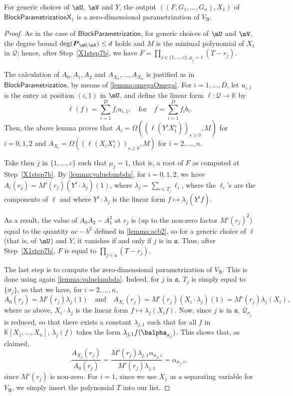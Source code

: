 \documentclass[12pt]{article}
\newcommand{\mat}[1]{\bm{\MakeUppercase{#1}}} %
\newcommand{\mainalgoname}{\mathsf{ BlockParametrization}}
\newcommand{\mf}{Y}
\newcommand{\residueI}{\mathscr{Q}}
\def\K{\mathbb{K}}
\def\K {\ensuremath{\mathbb{K}}}
\def\Kbar {{\ensuremath{\overline{\mathbb{K}}}}}
\begin{document}
\begin{lemma}
  For generic choices of $\mU$, $\mV$ and $\mf$, the output
  $((F,G_1,\dots,G_n),X_1)$ of $\mathsf{BlockParametrizationX}_1$ is a
  zero-dimensional parametrization of $V_{\mathfrak{A}}$.
\end{lemma}
\begin{proof}
  As in the case of $\mainalgoname$, for generic choices of $\mU$ and
  $\mV$, the degree bound $\deg(\mat{P}_{\mU,\mV}) \le d$ holds and
  $M$ is the minimal polynomial of $X_1$ in $\residueI$; hence, after
  Step~\ref{X1step7b}, we have $F=\prod_{j \in \{1,\dots,c\}, \mu_j=1}
  (T-r_j)$. 

  The calculation of $A_0,A_1,A_2$ and $A_{X_2},\dots,A_{X_n}$ is
  justified as in $\mainalgoname$, by means of
  \cref{lemma:omegaOmega}. For $i=1,\dots,D$, let $u_{i,1}$ is the entry at position
  $(i,1)$ in $\mU$, and define the linear 
form $\ell: \residueI \to \K$ by 
  $$\ell(f) = \sum_{i=1}^D f_i u_{i,1}, \quad\text{for}\quad f =
\sum_{i=1}^D f_i b_i.$$ Then, the above lemma proves that $A_i =
\Omega((\ell(\mf^i X_1^s))_{s\ge0},M)$ for $i=0,1,2$ and $A_{X_i} =
\Omega((\ell(X_i X_1^s))_{s\ge0},M)$ for $i=2,\dots,n$.

  Take then $j$ in $\{1,\dots,c\}$ such that $\mu_j=1$, that is, a
  root of $F$ as computed at Step~\ref{X1step7b}. By
  \cref{lemma:valuelambda}, for $i=0,1,2$, we have $ A_i(r_j) = M'(r_j)
  (\mf^i \cdot \lambda_j)(1)$, where $\lambda_j =\sum_{i \in T_j}
  \ell_i$, where the $\ell_i$'s are the components of $\ell$
  and where $\mf^i \cdot \lambda_j$ is the linear form $f \mapsto \lambda_j(\mf^i f)$.
  
  As a result, the value of $ A_0  A_2 -  A_1^2$ at
  $r_j$ is (up to the non-zero factor $M'(r_j)^2$) equal to the
  quantity $ac-b^2$ defined in \cref{lemma:acb2}, so for a
  generic choice of $\ell$ (that is, of $\mU$) and $\mf$, it vanishes if and only if $j$ is
  in $\mathfrak{a}$. Thus, after Step~\ref{X1step7b}, 
  $F$ is equal to $\prod_{j \in \mathfrak{a}} (T-r_j)$.
	
  The last step is to compute the zero-dimensional parametrization of
  $V_{\mathfrak{A}}$. This is done using again
  \cref{lemma:valuelambda}. Indeed, for $j$ in $\mathfrak{a}$, 
  $T_j$ is simply equal to $\{\sigma_j\}$, so that we have, for $i=2,\dots,n$,
  $$ A_0(r_j)=M'(r_j) \lambda_j(1) \quad\text{and}\quad 
  A_{X_i}(r_j) = M'(r_j) (X_i \cdot \lambda_j)(1) = M'(r_j) \lambda_j(X_i),$$
  where as above, $X_i \cdot \lambda_j$ is the linear form $f \mapsto \lambda_j(X_i f)$.
 Now, since $j$
  is in $\mathfrak{a}$, $\residueI_{\sigma_j}$ is reduced, so that there
  exists a constant $\lambda_{j,1}$ such that for all $f$ in
  $\Kbar[X_1,\dots,X_n]$, $\lambda_j(f)$ takes the form $\lambda_{j,1}
  f(\balpha_{\sigma_j})$. This shows that, as claimed,
  $$\frac{ A_{X_j}(r_j)}{ A_0 (r_j)} = 
  \frac
      {M'(r_j) \lambda_{j,1} \alpha_{\sigma_j,i}}{M'(r_j) \lambda_{j,1}} = \alpha_{\sigma_j,i},$$
      since $M'(r_j)$ is non-zero.
      For $i=1$, since we use $X_1$ as a separating variable for $V_{\mathfrak{A}}$, 
      we simply insert the polynomial $T$ into our list.
\end{proof}
\end{document}
